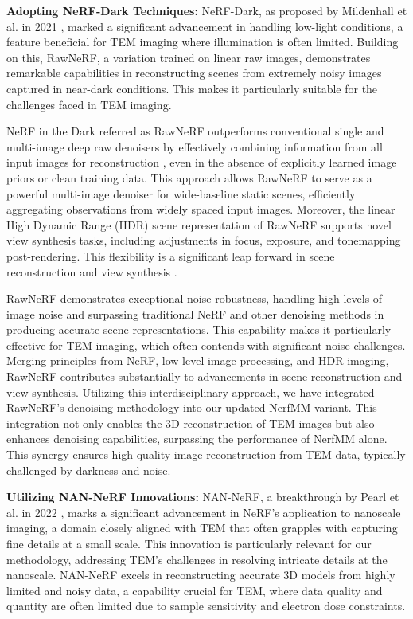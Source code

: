 \vspace{20pt}
\textbf{Adopting NeRF-Dark Techniques:} NeRF-Dark, as proposed by Mildenhall et al. in 2021 \cite{Mildenhall2021}, marked a significant advancement in handling low-light conditions, a feature beneficial for TEM imaging where illumination is often limited. Building on this, RawNeRF, a variation trained on linear raw images, demonstrates remarkable capabilities in reconstructing scenes from extremely noisy images captured in near-dark conditions. This makes it particularly suitable for the challenges faced in TEM imaging.

\vspace{10pt}
NeRF in the Dark referred as RawNeRF outperforms conventional single and multi-image deep raw denoisers by effectively combining information from all input images for reconstruction \cite{Mildenhall2021}, even in the absence of explicitly learned image priors or clean training data. This approach allows RawNeRF to serve as a powerful multi-image denoiser for wide-baseline static scenes, efficiently aggregating observations from widely spaced input images. Moreover, the linear High Dynamic Range (HDR) scene representation of RawNeRF supports novel view synthesis tasks, including adjustments in focus, exposure, and tonemapping post-rendering. This flexibility is a significant leap forward in scene reconstruction and view synthesis \cite{Mildenhall2021}.

\vspace{10pt}

RawNeRF demonstrates exceptional noise robustness, handling high levels of image noise and surpassing traditional NeRF and other denoising methods in producing accurate scene representations. This capability makes it particularly effective for TEM imaging, which often contends with significant noise challenges. Merging principles from NeRF, low-level image processing, and HDR imaging, RawNeRF contributes substantially to advancements in scene reconstruction and view synthesis. Utilizing this interdisciplinary approach, we have integrated RawNeRF's denoising methodology into our updated NerfMM variant. This integration not only enables the 3D reconstruction of TEM images but also enhances denoising capabilities, surpassing the performance of NerfMM alone. This synergy ensures high-quality image reconstruction from TEM data, typically challenged by darkness and noise.

\vspace{10pt}

\textbf{Utilizing NAN-NeRF Innovations:} 
NAN-NeRF, a breakthrough by Pearl et al. in 2022 \cite{Pearl2022}, marks a significant advancement in NeRF's application to nanoscale imaging, a domain closely aligned with TEM that often grapples with capturing fine details at a small scale. This innovation is particularly relevant for our methodology, addressing TEM's challenges in resolving intricate details at the nanoscale. NAN-NeRF excels in reconstructing accurate 3D models from highly limited and noisy data, a capability crucial for TEM, where data quality and quantity are often limited due to sample sensitivity and electron dose constraints.


